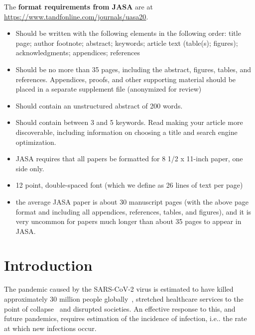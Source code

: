 \documentclass[12pt]{article}
\makeatletter
\DeclareRobustCommand\onedot{\futurelet\@let@token\@onedot}
\def\@onedot{\ifx\@let@token.\else.\null\fi\xspace}
\def\ie{i.e\onedot} \def\Ie{{I.e}\onedot}
\makeatother
\begin{document}
The \textbf{format requirements from JASA} are at \url{https://www.tandfonline.com/journals/uasa20}.
\begin{itemize}
    \item Should be written with the following elements in the following order: title page; author footnote; abstract; keywords; article text (table(s); figures); acknowledgments; appendices; references
    \item Should be no more than 35 pages, including the abstract, figures, tables, and references. Appendices, proofs, and other supporting material should be placed in a separate supplement file (anonymized for review)
    \item Should contain an unstructured abstract of 200 words.
    \item Should contain between 3 and 5 keywords. Read making your article more discoverable, including information on choosing a title and search engine optimization.
    \item JASA requires that all papers be formatted for 8 1/2 x 11-inch paper, one side only.
    \item 12 point, double-spaced font (which we define as 26 lines of text per page)
    \item the average JASA paper is about 30 manuscript pages (with the above page format and including all appendices, references, tables, and figures), and it is very uncommon for papers much longer than about 35 pages to appear in JASA. 
\end{itemize}

\tableofcontents

\newpage
{} %
\section{Introduction} \label{sec:intro}

The pandemic caused by the SARS-CoV-2 virus is estimated to have killed approximately 30 million people globally~\citep{whoCOVIDExcess,economistCOVIDExcess}, stretched healthcare services to the point of collapse~\citep{fongNHS} and disrupted societies.
An effective response to this, and future pandemics, requires estimation of the incidence of infection, \ie the rate at which new infections occur.

\end{document}
